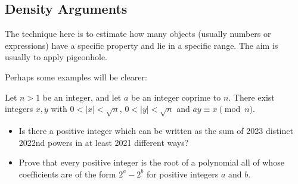 \subsection{Density Arguments}
The technique here is to estimate how many objects (usually numbers or
expressions) have a specific property and lie in a specific range. The aim is
usually to apply pigeonhole.

Perhaps some examples will be clearer:
\begin{result}{\label{r:a:n:den:1}}
  Let $n>1$ be an integer, and let $a$ be an integer coprime to $n$. 
      There exist integers $x,y$ with $0<|x|<\sqrt n$, $0<|y|<\sqrt n$ and
      $ay\equiv x\pmod n$.
\end{result}
\begin{itemize}
  \item Is there a positive integer which can be written as the sum of 2023
    distinct 2022nd powers in at least 2021 different ways?
  \item Prove that every positive integer is the root of a polynomial all of whose
      coefficients are of the form $2^a-2^b$ for positive integers $a$ and $b$.
\end{itemize}
